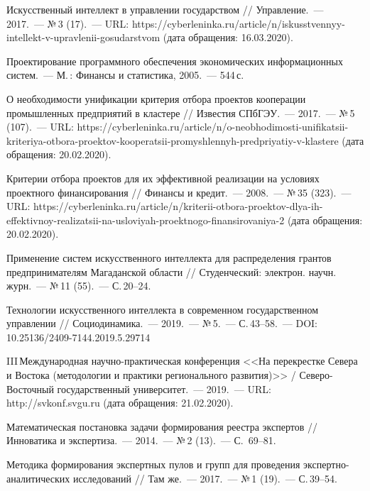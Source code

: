 \begin{thebibliography}{99}

\bibitem{} Искусственный интеллект в управлении государством // Управление.~--- 2017.~--- №\,3 (17).~--- URL: https://cyberleninka.ru/\-arti\-cle/\-n/iskus\-stven\-nyy-intel\-lekt-v-up\-rav\-lenii-gosu\-dars\-tvom (дата обращения: 16.03.2020).

\bibitem{} Проектирование программного обеспечения экономических информационных систем.~--- М.\,: Финансы и статистика, 2005.~--- 544\,с.

\bibitem{} О необходимости унификации критерия отбора проектов кооперации промышленных предприятий в кластере // Известия СПбГЭУ.~--- 2017.~--- №\,5 (107).~--- URL: https://cyberleninka.ru/article/n/o-neobhodimosti-unifikatsii-kriteriya-otbora-proektov-kooperatsii-promyshlennyh-predpriyatiy-v-klastere (дата обращения: 20.02.2020).

\bibitem{} Критерии отбора проектов для их эффективной реализации на условиях проектного финансирования // Финансы и кредит.~--- 2008.~--- №\,35 (323).~--- URL: https://cyberleninka.ru/article/n/kriterii-otbora-proektov-dlya-ih-effektivnoy-realizatsii-na-usloviyah-proektnogo-finansirovaniya-2 (дата обращения: 20.02.2020).

\bibitem{} Применение систем искусственного интеллекта для распределения грантов предпринимателям Магаданской области // Студенческий: электрон. научн. журн.~--- №\,11 (55).~--- С.\,20--24.

\bibitem{} Технологии искусственного интеллекта в современном государственном управлении // Социодинамика.~--- 2019.~--- №\,5.~--- С.\,43--58.~--- DOI: 10.25136/2409-7144.2019.5.29714

\bibitem{}III\,Международная научно-практическая конференция <<На перекрестке Севера и Востока (методологии и практики регионального развития)>> / Северо-Восточный государственный университет.~--- 2019.~--- URL: http://svkonf.svgu.ru (дата обращения: 21.02.2020).

\bibitem{} Математическая постановка задачи формирования реестра экспертов // Инноватика и экспертиза.~--- 2014.~--- №\,2 (13).~--- С.~69--81.

\bibitem{} Методика формирования экспертных пулов и групп для проведения экспертно-аналитических исследований // Там же.~--- 2017.~--- №\,1 (19).~--- С.\,39--54.


\end{thebibliography}
